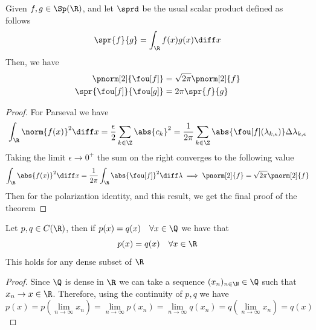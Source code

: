 \documentclass[../mmf.tex]{subfiles}
\begin{document}
\begin{thm}[Plancherel]
	Given $f,g\in\Sp(\R)$, and let $\sprd$ be the usual scalar product defined as follows
	\begin{equation*}
		\spr{f}{g}=\int_{\R}^{}f(x)g(x)\diff x
	\end{equation*}
	Then, we have
	\begin{equation}
		\begin{aligned}
			\pnorm[2]{\fou[f]}&=\sqrt{2\pi}\pnorm[2]{f}\\
			\spr{\fou[f]}{\fou[g]}&=2\pi\spr{f}{g}
		\end{aligned}
		\label{eq:planchthm}
	\end{equation}
\end{thm}
\begin{proof}
	For Parseval we have
	\begin{equation*}
		\int_{\R}^{}\norm{f(x)}^2\diff x=\frac{\epsilon}{2}\sum_{k\in\Z}^{}\abs{c_k}^2=\frac{1}{2\pi}\sum_{k\in\Z}^{}\abs{\fou[f](\lambda_{k,\epsilon})}\Delta\lambda_{k,\epsilon}
	\end{equation*}
	Taking the limit $\epsilon\to0^+$ the sum on the right converges to the following value
	\begin{equation*}
		\int_{\R}^{}\abs{f(x)}^2\diff x=\frac{1}{2\pi}\int_{\R}^{}\abs{\fou[f]}^2\diff\lambda\implies{}\pnorm[2]{f}=\sqrt{2\pi}\pnorm[2]{f}
	\end{equation*}
	Then for the polarization identity, and this result, we get the final proof of the theorem
\end{proof}
\begin{thm}
	Let $p,q\in C(\R)$, then if $p(x)=q(x)\quad\forall x\in\Q$ we have that
	\begin{equation*}
		p(x)=q(x)\quad\forall x\in\R
	\end{equation*}
	This holds for any dense subset of $\R$
\end{thm}
\begin{proof}
	Since $\Q$ is dense in $\R$ we can take a sequence $(x_n)_{n\in\N}\in\Q$ such that $x_n\to x\in\R$. Therefore, using the continuity of $p,q$ we have
	\begin{equation*}
		p(x)=p\left( \lim_{n\to\infty}x_n \right)=\lim_{n\to\infty}p(x_n)=\lim_{n\to\infty}q(x_n)=q\left( \lim_{n\to\infty}x_n \right)=q(x)
	\end{equation*}
\end{proof}
\end{document}
